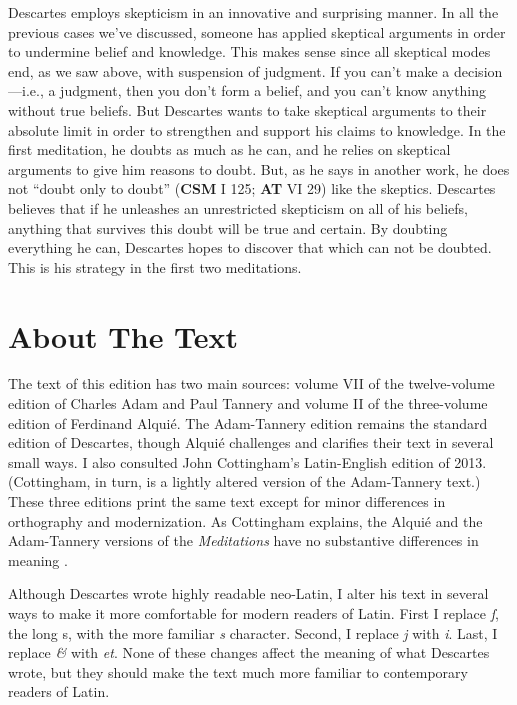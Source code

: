 Descartes employs skepticism in an innovative and surprising manner. In all the previous cases we've discussed, someone has applied skeptical arguments in order to undermine belief and knowledge. This makes sense since all skeptical modes end, as we saw above, with suspension of judgment. If you can't make a decision---i.e., a judgment, then you don't form a belief, and you can't know anything without true beliefs. But Descartes wants to take skeptical arguments to their absolute limit in order to strengthen and support his claims to knowledge. In the first meditation, he doubts as much as he can, and he relies on skeptical arguments to give him reasons to doubt. But, as he says in another work, he does not ``doubt only to doubt'' (\textbf{CSM} I 125; \textbf{AT} VI 29) like the skeptics. Descartes believes that if he unleashes an unrestricted skepticism on all of his beliefs, anything that survives this doubt will be true and certain. By doubting everything he can, Descartes hopes to discover that which can not be doubted. This is his strategy in the first two meditations.

\section{About The Text}

The text of this edition has two main sources: volume VII of the twelve-volume edition of Charles Adam and Paul Tannery and volume II of the three-volume edition of Ferdinand Alquié. The Adam-Tannery edition remains the standard edition of Descartes, though Alquié challenges and clarifies their text in several small ways. I also consulted John Cottingham's Latin-English edition of 2013. (Cottingham, in turn, is a lightly altered version of the Adam-Tannery text.) These three editions print the same text except for minor differences in orthography and modernization. As Cottingham explains, the Alquié and the Adam-Tannery versions of the \textit{Meditations} have no substantive differences in meaning \parencite[xxxii, footnote 5]{cottingham2013}.

Although Descartes wrote highly readable neo-Latin, I alter his text in several ways to make it more comfortable for modern readers of Latin. First I replace  \textit{ſ}, the long s, with the more familiar \textit{s} character. Second, I replace \textit{j} with \textit{i}. Last, I replace \textit{\&} with \textit{et}. None of these changes affect the meaning of what Descartes wrote, but they should make the text much more familiar to contemporary readers of Latin.

